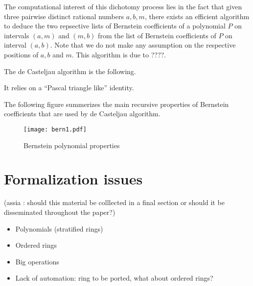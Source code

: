 \documentclass{mscs}
\begin{document}
 The
computational interest of this dichotomy process lies in the fact that
given three pairwise distinct rational numbers $a, b, m$, there exists an
efficient algorithm to deduce the two repsective lists of Bernstein
coefficients of a polynomial $P$ on intervals $(a, m)$ and $(m, b)$
from the list of Bernstein coefficients of $P$ on interval $(a,
b)$. Note that we do not make any assumption on the respective
positions of $a, b$ and $m$. This algorithm is due to ????.

The de Casteljau algorithm is the following.

It relies on a ``Pascal triangle like'' identity.


The following figure summerizes the main recursive properties of
Bernstein coefficients that are used by de Casteljau algorithm.
\begin{figure}\label{bern}
\begin{center}
\texttt{[image: bern1.pdf]}
\end{center}
\caption{Bernstein polynomial properties}
\end{figure}



\section{Formalization issues}

(assia : should this material be colllected in a final section or
should it be disseminated throughout the paper?)

\begin{itemize}
\item Polynomials (stratified rings)
\item Ordered rings
\item Big operations
\item Lack of automation: ring to be ported, what about ordered rings?
\end{itemize}



\end{document}
